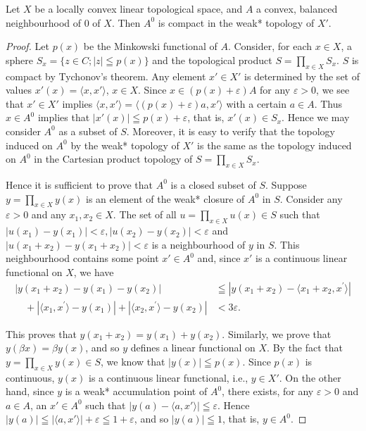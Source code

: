 
\begin{theorem}\label{thm:AV.1.Theorem.1} Let $X$ be a locally convex linear topological space, and $A$ a convex, balanced neighbourhood of $0$ of $X$. Then $A^{0}$ is compact in the weak* topology of $X'$. 
\end{theorem}

\begin{proof}
 Let $p(x)$ be the Minkowski functional of $A$. Consider, for each $x \in X$, a sphere $S_x = \{z \in C; |z| \leqq p(x)\}$ and the topological product $S = \prod\limits_{x \in X} S_x$. $S$ is compact by Tychonov's theorem. Any element $x' \in X'$ is determined by the set of values $x'(x) = \langle x, x' \rangle$, $x \in X$. Since $x \in (p(x) + \varepsilon)A$ for any $\varepsilon > 0$, we see that $x' \in X'$ implies $\langle x, x' \rangle = \langle (p(x) + \varepsilon)a, x' \rangle$ with a certain $a \in A$. Thus $x \in A^0$ implies that $|x'(x)| \leqq p(x) + \varepsilon$, that is, $x'(x) \in S_x$. Hence we may consider $A^0$ as a subset of $S$. Moreover, it is easy to verify that the topology induced on $A^0$ by the weak* topology of $X'$ is the same as the topology induced on $A^0$ in the Cartesian product topology of $S = \prod\limits_{x \in X} S_x$. 

Hence it is sufficient to prove that $A^0$ is a closed subset of $S$. Suppose $y = \prod\limits_{x \in X} y(x)$ is an element of the weak* closure of $A^0$ in $S$. Consider any $\varepsilon > 0$ and any $x_1, x_2 \in X$. The set of all $u = \prod\limits_{x \in X} u(x) \in S$ such that 
$|u(x_{1})-y(x_{1})|<\varepsilon, |u(x_{2})-y(x_{2})|<\varepsilon$ and $|u(x_{1}+x_{2})-y(x_{1}+x_{2})|<\varepsilon$ is a neighbourhood of $y$ in $S$. This neighbourhood contains some point $x'\in A^{0}$ and, since $x'$ is a continuous linear functional on $X$, we have 
\[
\begin{aligned}
\left| y (x _{1} + x _{2}) - y (x _{1}) - y (x _{2}) \right|& \leqq \left| y (x _{1} + x _{2}) - \langle x _{1} + x _{2}, x ^{\prime} \rangle \right|
\\
\quad + \left| \langle x _{1}, x ^{\prime} \rangle - y (x _{1}) \right| + \left| \langle x _{2}, x ^{\prime} \rangle - y (x _{2}) \right|& < 3 \varepsilon .
\end{aligned}
\]

This proves that $y(x_1 + x_2) = y(x_1) + y(x_2)$. Similarly, we prove that $y(\beta x) = \beta y(x)$, and so $y$ defines a linear functional on $X$. By the fact that $y = \prod\limits_{x \in X} y(x) \in S$, we know that $|y(x)| \leqq p(x)$. Since $p(x)$ is continuous, $y(x)$ is a continuous linear functional, i.e., $y \in X'$. On the other hand, since $y$ is a weak* accumulation point of $A^0$, there exists, for any $\varepsilon > 0$ and $a \in A$, an $x' \in A^0$ such that $|y(a) - \langle a, x' \rangle| \leqq \varepsilon$. Hence $|y(a)| \leqq |\langle a, x' \rangle| + \varepsilon \leqq 1 + \varepsilon$, and so $|y(a)| \leqq 1$, that is, $y \in A^0$. 
\end{proof}

